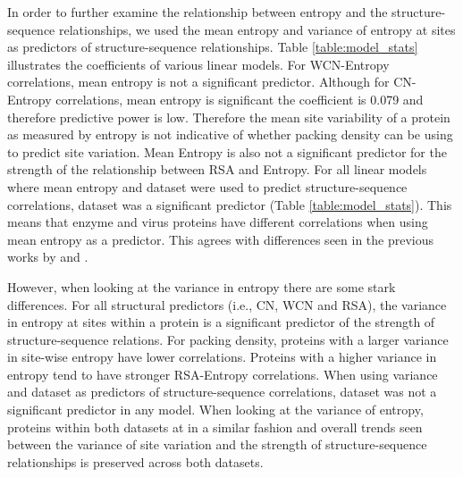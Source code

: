 \documentclass[12pt]{article}
\begin{document}
\indent In order to further examine the relationship between entropy and the structure-sequence relationships, we used the mean entropy and variance of entropy at sites as predictors of structure-sequence relationships. Table \ref{table:model_stats} illustrates the coefficients of various linear models.  For WCN-Entropy correlations, mean entropy is not a significant predictor. Although for CN-Entropy correlations, mean entropy is significant the coefficient is 0.079 and therefore predictive power is low. Therefore the mean site variability of a protein as measured by entropy is not indicative of whether packing density can be using to predict site variation.  Mean Entropy is also not a significant predictor for the strength of the relationship between RSA and Entropy. For all linear models where mean entropy and dataset were used to predict structure-sequence correlations, dataset was a significant predictor (Table \ref{table:model_stats}). This means that enzyme and virus proteins have different correlations when using mean entropy as a predictor. This agrees with differences seen in the previous works by \cite{Yehetal2014} and \cite{Shahmoradietal2014}.  

\indent However, when looking at the variance in entropy there are some stark differences. For all structural predictors (i.e., CN, WCN and RSA), the variance in entropy at sites within a protein is a significant predictor of the strength of structure-sequence relations. For packing density, proteins with a larger variance in site-wise entropy have lower correlations. Proteins with a higher variance in entropy tend to have stronger RSA-Entropy correlations. When using variance and dataset as predictors of structure-sequence correlations, dataset was not a significant predictor in any model. When looking at the variance of entropy, proteins within both datasets at in a similar fashion and overall trends seen between the variance of site variation and the strength of structure-sequence relationships is preserved across both datasets. 
\end{document}
